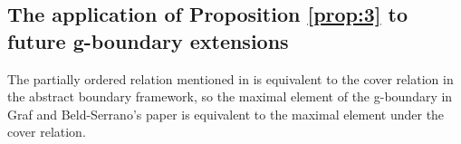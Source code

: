 \documentclass[pdflatex,sn-mathphys-num]{sn-jnl}
\newtheorem{prop}[theorem]{Proposition}
\theoremstyle{definition}
\begin{document}


\subsection{The application of Proposition \ref{prop:3} to future g-boundary extensions}\label{section 5}
The partially ordered relation mentioned in \cite{Graf_2024} is equivalent to the cover relation in the abstract boundary framework, so the maximal element of the g-boundary in Graf and Beld-Serrano's paper is equivalent to the maximal element under the cover relation.\\
\end{document}
